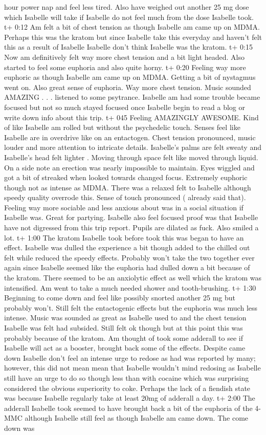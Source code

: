 \documentclass[12pt]{book}
\begin{document}
hour power nap and feel less tired. Also have weighed out another 25 mg dose which Isabelle will take if Isabelle do not feel much from the dose Isabelle took. t+ 0:12 Am felt a bit of chest tension as though Isabelle am came up on MDMA. Perhaps this was the kratom but since Isabelle take this everyday and haven't felt this as a result of Isabelle Isabelle don't think Isabelle was the kratom. t+ 0:15 Now am definitively felt way more chest tension and a bit light headed. Also started to feel some euphoria and also quite horny. t+ 0:20 Feeling way more euphoric as though Isabelle am came up on MDMA. Getting a bit of nystagmus went on. Also great sense of euphoria. Way more chest tension. Music sounded AMAZING . . .  listened to some psytrance. Isabelle am had some trouble became focused but not so much stayed focused once Isabelle begin to read a blog or write down info about this trip. t+ 045 Feeling AMAZINGLY AWESOME. Kind of like Isabelle am rolled but without the psychedelic touch. Senses feel like Isabelle are in overdrive like on an entactogen. Chest tension pronounced, music louder and more attention to intricate details. Isabelle's palms are felt sweaty and Isabelle's head felt lighter . Moving through space felt like moved through liquid. On a side note an erection was nearly impossible to maintain. Eyes wiggled and got a bit of streaked when looked towards changed focus. Extremely euphoric though not as intense as MDMA. There was a relaxed felt to Isabelle although speedy quality overrode this. Sense of touch pronounced ( already said that). Feeling way more sociable and less anxious about was in a social situation if Isabelle was. Great for partying. Isabelle also feel focused proof was that Isabelle have not digressed from this trip report. Pupils are dilated as fuck. Also smiled a lot. t+ 1:00 The kratom Isabelle took before took this was began to have an effect. Isabelle was dulled the experience a bit though added to the chilled out felt while reduced the speedy effects. Probably won't take the two together ever again since Isabelle seemed like the euphoria had dulled down a bit because of the kratom. There seemed to be an anxiolytic effect as well which the kratom was intensified. Am went to take a much needed shower and tooth-brushing. t+ 1:30 Beginning to come down and feel like possibly snorted another 25 mg but probably won't. Still felt the entactogenic effects but the euphoria was much less intense. Music was sounded as great as Isabelle used to and the chest tension Isabelle was felt had subsided. Still felt ok though but at this point this was probably because of the kratom. Am thought of took some adderall to see if Isabelle will act as a booster, brought back some of the effects. Despite came down Isabelle don't feel an intense urge to redose as had was reported by many; however, this did not mean mean that Isabelle wouldn't mind redosing as Isabelle still have an urge to do so though less than with cocaine which was surprising considered the obvious superiority to coke. Perhaps the lack of a fiendish state was because Isabelle regularly take at least 20mg of adderall a day. t+ 2:00 The adderall Isabelle took seemed to have brought back a bit of the euphoria of the 4-MMC although Isabelle still feel as though Isabelle am came down. The come down was 
\end{document}
